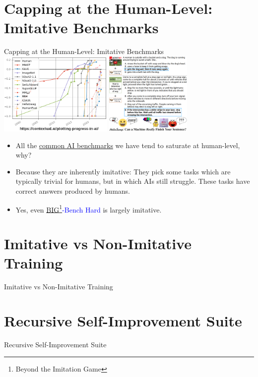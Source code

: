 \documentclass{beamer}
\begin{document}
\section{Capping at the Human-Level: Imitative Benchmarks}

\begin{frame}{Capping at the Human-Level: Imitative Benchmarks}
  \href{https://contextual.ai/plotting-progress-in-ai/}{\includegraphics[height=4cm]{AI-progress.png}}
  \hspace{0.3cm}
  \href{https://arxiv.org/abs/1905.07830}{\includegraphics[height=4cm]{HellaSwag.png}}
  \begin{itemize}
    \item All the \textcolor{blue}{\href{https://www.whytryai.com/p/llm-benchmarks}{common AI benchmarks}} we have tend to saturate at human-level, why?
    \item Because they are inherently imitative: They pick some tasks which are typically trivial for humans, but in which AIs still struggle. These tasks have correct answers produced by humans.
    \item Yes, even \textcolor{blue}{\href{https://github.com/google/BIG-bench/blob/main/bigbench/benchmark_tasks/README.md}{BIG\footnote{Beyond the Imitation Game}-Bench Hard}} is largely imitative.
  \end{itemize}
\end{frame}

\section{Imitative vs Non-Imitative Training}

\begin{frame}{Imitative vs Non-Imitative Training}
\end{frame}

\section{Recursive Self-Improvement Suite}
\begin{frame}{Recursive Self-Improvement Suite}
\end{frame}
\end{document}
